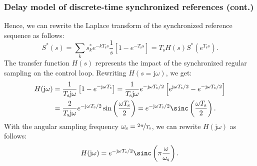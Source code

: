 \begin{frame}
    \frametitle{Delay model of discrete-time synchronized references (cont.)}
    Hence, we can rewrite the Laplace transform of the synchronized reference sequence as follows:
    \begin{equation}
        S^*(s) = \sum_{k} s_k^*e^{-kT_\mathrm{s}s} \frac{1}{s}\left[1  - e^{-T_\mathrm{s}s} \right] = T_\mathrm{s} H(s) S^*(e^{T_\mathrm{s}s}).
    \end{equation}\pause
    The transfer function $H(s)$ represents the impact of the synchronized regular sampling on the control loop. Rewriting $H(s=\mathrm{j}\omega)$, we get:
    \begin{equation}
        \begin{split}
            H(\mathrm{j}\omega) & = \frac{1}{T_\mathrm{s}\mathrm{j}\omega}\left[1 - e^{-\mathrm{j}\omega T_\mathrm{s}}\right] = \frac{1}{T_\mathrm{s}\mathrm{j}\omega}e^{-\mathrm{j}\omega T_\mathrm{s}/2}\left[e^{\mathrm{j}\omega T_\mathrm{s}/2} - e^{-\mathrm{j}\omega T_\mathrm{s}/2}\right] \\
                                & = \frac{2}{T_\mathrm{s}\mathrm{j}\omega}e^{-\mathrm{j}\omega T_\mathrm{s}/2}\sin\left(\frac{\omega T_\mathrm{s}}{2}\right) = e^{-\mathrm{j}\omega T_\mathrm{s}/2}\sinc\left(\frac{\omega T_\mathrm{s}}{2}\right).
        \end{split}
    \end{equation}\pause
    With the angular sampling frequency $\omega_\mathrm{s} = \nicefrac{2\pi}{T_\mathrm{s}}$, we can rewrite $H(\mathrm{j}\omega)$ as follows:
    \begin{equation}
        H(\mathrm{j}\omega) = e^{-\mathrm{j}\omega T_\mathrm{s}/2}\sinc\left(\pi\frac{\omega}{\omega_\mathrm{s}}\right).
        \label{eq:regular_sampling_transfer_function_sinc}
    \end{equation}
\end{frame}

